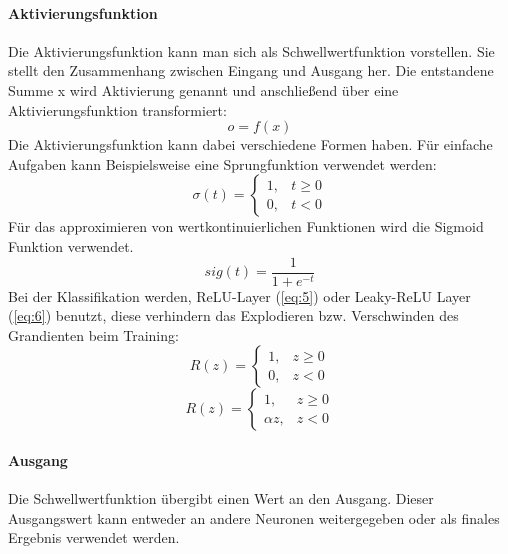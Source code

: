 \paragraph{Aktivierungsfunktion}
Die Aktivierungsfunktion kann man sich als Schwellwertfunktion vorstellen. Sie stellt den Zusammenhang zwischen Eingang und Ausgang her. Die entstandene Summe x wird Aktivierung genannt und anschließend über eine Aktivierungsfunktion transformiert:
\begin{equation}
	o = f(x) \label{eq:2}
\end{equation}
Die Aktivierungsfunktion kann dabei verschiedene Formen haben. Für einfache Aufgaben kann Beispielsweise eine Sprungfunktion verwendet werden:
\begin{equation}
\sigma(t) = \begin{cases}
  1, & t \geq 0 \\
  0, & t < 0 
\end{cases}
\label{eq:3}
\end{equation}
Für das approximieren von wertkontinuierlichen Funktionen wird die Sigmoid Funktion verwendet.
\begin{equation}
	sig(t) = \frac{1}{1 + e^{-t}} \label{eq:4}
\end{equation}
Bei der Klassifikation werden, ReLU-Layer (\ref{eq:5}) oder Leaky-ReLU Layer (\ref{eq:6}) benutzt, diese verhindern das Explodieren bzw. Verschwinden des Grandienten beim Training:
\begin{equation}
R(z) = \begin{cases}
  1, &  z \geq 0\\ 
0, &  z < 0 
\end{cases}
\label{eq:5}
\end{equation}
\begin{equation}
R(z) = \begin{cases}
1, &  z \geq 0\\	 
\alpha z, &  z < 0 
\end{cases}
\label{eq:6}
\end{equation}

\paragraph{Ausgang}
Die Schwellwertfunktion übergibt einen Wert an den Ausgang. Dieser Ausgangswert kann entweder an andere Neuronen weitergegeben oder als finales Ergebnis verwendet werden.


